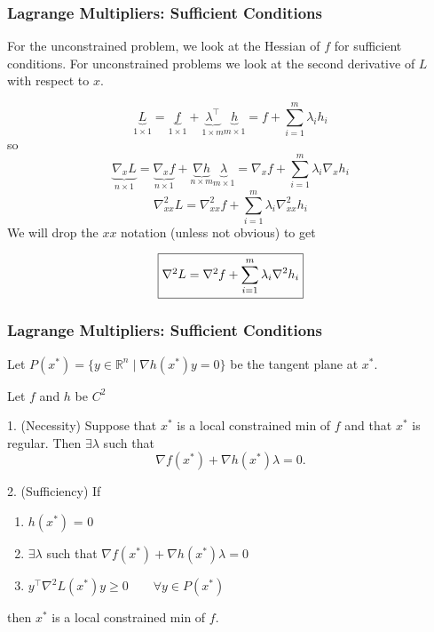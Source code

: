 \documentclass{beamer}
\begin{document}
\begin{frame}\frametitle{Lagrange Multipliers: Sufficient Conditions}
	For the unconstrained problem, we look at the Hessian of $f$ for sufficient conditions.  For unconstrained problems we look at the second derivative of $L$ with respect to $x$.
	
	\vfill
	
	\[ 
		\underbrace{L}_{1\times 1} = \underbrace{f}_{1\times 1} + \underbrace{\lambda^\top }_{1\times m}\underbrace{h}_{m\times 1} = f + \sum_{i=1}^m\lambda_i h_i 
	\]
	so
	\[ 
		\underbrace{\nabla_x L}_{n\times 1} = \underbrace{\nabla_xf}_{n\times 1} + \underbrace{\nabla h}_{n\times m}\underbrace{\lambda}_{m\times 1} = \nabla_xf + \sum_{i=1}^m\lambda_i\nabla_x h_i 
	\]
	\[ 
		\nabla_{xx}^2L = \nabla_{xx}^2f + \sum_{i=1}^m\lambda_i\nabla_{xx}^2 h_i  
	\]
	We will drop the $xx$ notation (unless not obvious) to get
	
	\[ 
		\fbox{$\nabla^2L = \nabla^2f + \displaystyle\sum_{i=1}^m\lambda_i\nabla^2h_i$}
	\]	
\end{frame}

\begin{frame}\frametitle{Lagrange Multipliers: Sufficient Conditions}
	Let $P(x^{\ast}) = \{ y\in \mathbb{R}^n \mid \nabla h(x^{\ast})y = 0 \}$ be the tangent plane at $x^{\ast}$.

	\begin{theorem}
		Let $f$ and $h$ be $C^2$
		
		1. (Necessity) Suppose that $x^{\ast}$ is a local constrained min of $f$ and that $x^{\ast}$ is regular.  Then $\exists \lambda$ such that
		\[ 
			\nabla f(x^{\ast}) + \nabla h(x^{\ast})\lambda = 0. 
		\]
		
		2. (Sufficiency)  If 
		\begin{enumerate}
		  \item $h(x^{\ast})$ = 0
		  \item $\exists \lambda$ such that $\nabla f(x^{\ast}) + \nabla h(x^{\ast}) \lambda = 0$ 
		  \item $y^\top \nabla^2L(x^{\ast})y \geq 0 \qquad \forall y\in P(x^{\ast})$
		\end{enumerate}
		 then $x^{\ast}$ is a local constrained min of $f$. 		
	\end{theorem}
\end{frame}
\end{document}
